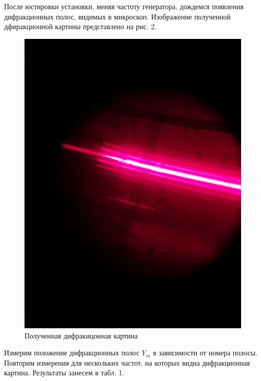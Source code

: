 \documentclass[a4paper,12pt]{article}
\begin{document}
\noindent
После юстировки установки, меняя частоту генератора, дождемся появления дифракционных полос, видимых в микроскоп. Изображение полученной дфиракционной картины представлено на рис. 2.

\begin{figure}[H]
    \centering
    \includegraphics[scale=0.2]{pic_1.png}
    \caption{Полученная дифракицонная картина}
\end{figure}

\noindent
Измерим положение дифракционных полос $Y_m$ в зависимости от номера полосы. Повторим измерения для нескольких частот, на которых видна дифракционная картина. Результаты занесем в табл. 1.
\end{document}
